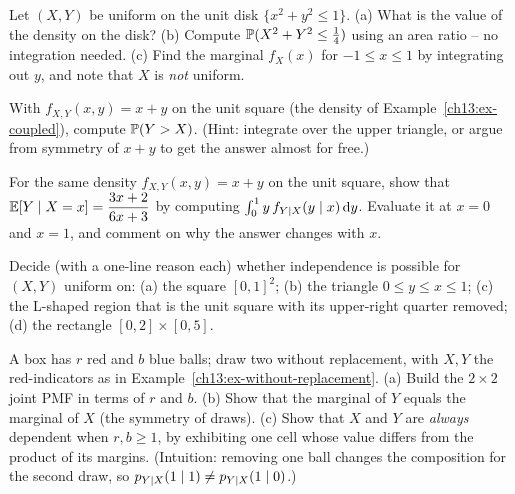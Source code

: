 \begin{exercise}
\label{ch13:ex-disk}
Let $(X,Y)$ be uniform on the unit disk $\{x^2+y^2\le 1\}$.
(a) What is the value of the density on the disk? (b) Compute
$\P(X^2+Y^2 \le \tfrac14)$ using an area ratio -- no integration needed.
(c) Find the marginal $f_X(x)$ for $-1\le x\le 1$ by integrating out $y$, and
note that $X$ is \emph{not} uniform.
\end{exercise}

\begin{exercise}
\label{ch13:ex-region}
With $f_{X,Y}(x,y) = x+y$ on the unit square (the density of
Example~\ref{ch13:ex-coupled}), compute $\P(Y > X)$. (Hint: integrate over the
upper triangle, or argue from symmetry of $x+y$ to get the answer almost for
free.)
\end{exercise}

\begin{exercise}
\label{ch13:ex-cond-vary}
For the same density $f_{X,Y}(x,y)=x+y$ on the unit square, show that
$\E[Y\given X=x] = \dfrac{3x+2}{6x+3}$ by computing
$\int_0^1 y\,f_{Y\given X}(y\given x)\,\dd y$. Evaluate it at $x=0$ and $x=1$, and
comment on why the answer changes with $x$.
\end{exercise}

\begin{exercise}
\label{ch13:ex-support}
Decide (with a one-line reason each) whether independence is possible for $(X,Y)$
uniform on: (a) the square $[0,1]^2$; (b) the triangle $0\le y\le x\le 1$;
(c) the L-shaped region that is the unit square with its upper-right quarter
removed; (d) the rectangle $[0,2]\times[0,5]$.
\end{exercise}

\begin{exercise}
\label{ch13:ex-without-gen}
A box has $r$ red and $b$ blue balls; draw two without replacement, with $X,Y$
the red-indicators as in Example~\ref{ch13:ex-without-replacement}. (a) Build the
$2\times 2$ joint PMF in terms of $r$ and $b$. (b) Show that the marginal of $Y$
equals the marginal of $X$ (the symmetry of draws). (c) Show that $X$ and $Y$ are
\emph{always} dependent when $r,b\ge 1$, by exhibiting one cell whose value
differs from the product of its margins. (Intuition: removing one ball changes
the composition for the second draw, so $p_{Y\given X}(1\given 1)\ne
p_{Y\given X}(1\given 0)$.)
\end{exercise}


